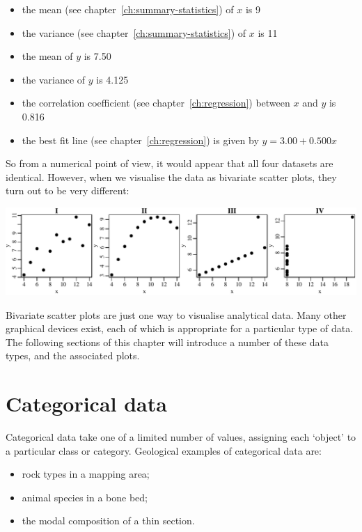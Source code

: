 \begin{itemize}\label{pg:anscombe}
\item the mean (see chapter~\ref{ch:summary-statistics}) of $x$ is 9
\item the variance (see chapter~\ref{ch:summary-statistics}) of $x$ is 11
\item the mean of $y$ is 7.50
\item the variance of $y$ is 4.125
\item the correlation coefficient (see chapter~\ref{ch:regression})
  between $x$ and $y$ is 0.816
\item the best fit line (see chapter~\ref{ch:regression}) is given by $y =
  3.00 + 0.500 x$
\end{itemize}

So from a numerical point of view, it would appear that all four
datasets are identical. However, when we visualise the data as
bivariate scatter plots, they turn out to be very different:\medskip

\noindent\includegraphics[width=\textwidth]{../figures/anscombe.pdf}
\begingroup
{}\label{fig:anscombe}
\endgroup

Bivariate scatter plots are just one way to visualise analytical data.
Many other graphical devices exist, each of which is appropriate for a
particular type of data. The following sections of this chapter will
introduce a number of these data types, and the associated plots.

\section{Categorical data}
\label{sec:categorical}

Categorical data take one of a limited number of values, assigning
each `object' to a particular class or category. Geological examples
of categorical data are:

\begin{itemize}
\item rock types in a mapping area;
\item animal species in a bone bed;
\item the modal composition of a thin section.
\end{itemize}

